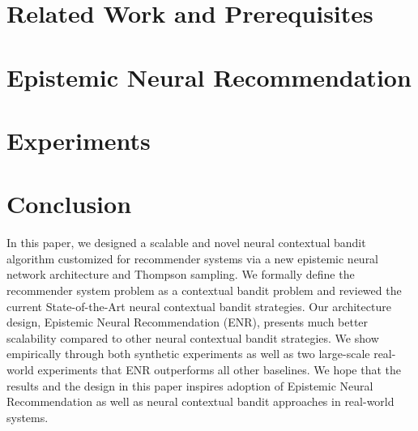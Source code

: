 \documentclass[sigconf]{acmart}
\begin{document}
\section{Related Work and Prerequisites}


\section{Epistemic Neural Recommendation}


\section{Experiments}



\section{Conclusion}
In this paper, we designed a scalable and novel neural contextual bandit algorithm customized for recommender systems via a new epistemic neural network architecture and Thompson sampling. We formally define the recommender system problem as a contextual bandit problem and reviewed the current State-of-the-Art neural contextual bandit strategies. Our architecture design, Epistemic Neural Recommendation (ENR), presents much better scalability compared to other neural contextual bandit strategies. We show empirically through both synthetic experiments as well as two large-scale real-world experiments that ENR outperforms all other baselines. We hope that the results and the design in this paper inspires adoption of Epistemic Neural Recommendation as well as neural contextual bandit approaches in real-world systems.



\end{document}
